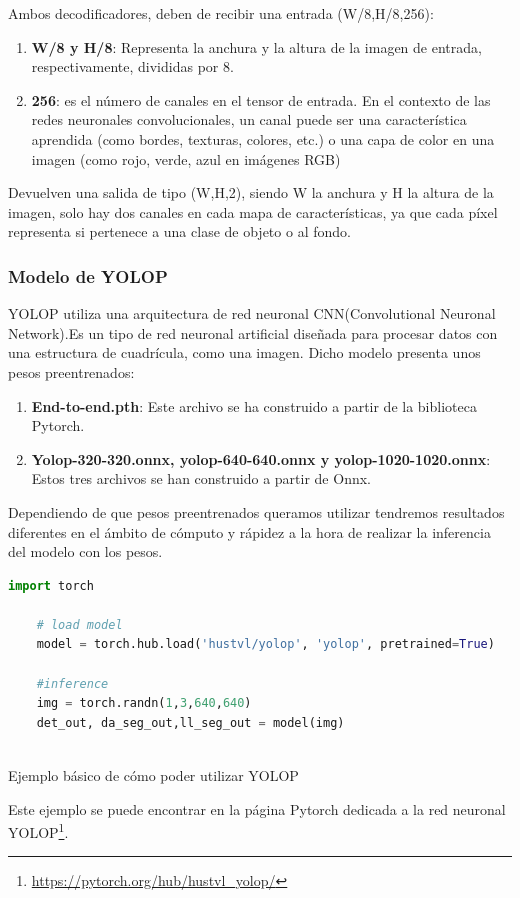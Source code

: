 Ambos decodificadores, deben de recibir una entrada (W/8,H/8,256): \newline 
\begin{enumerate}
  \item \textbf{W/8 y H/8}: Representa la anchura y la altura de la imagen de entrada, respectivamente, divididas por 8.
  \item \textbf{256}: es el número de 
  canales en el tensor de entrada. En el contexto de las redes neuronales convolucionales, 
  un canal puede ser una característica aprendida (como bordes, texturas, colores, etc.) o una capa de color en una imagen (como rojo, verde, azul en imágenes RGB)
\end{enumerate}

Devuelven una salida de tipo (W,H,2), siendo W la anchura y H la altura de la imagen, solo hay dos canales en cada mapa de características, ya que cada píxel 
representa si pertenece a una clase de objeto o al fondo. 

\subsubsection{Modelo de YOLOP}
\label{sec:Modelo_YOLOP}

YOLOP utiliza una arquitectura de red neuronal CNN(Convolutional Neuronal Network).Es un tipo de red neuronal artificial diseñada para procesar datos con una
estructura de cuadrícula, como una imagen. Dicho modelo presenta unos pesos preentrenados: 

\begin{enumerate}
  \item \textbf{End-to-end.pth}: Este archivo se ha construido a partir de la biblioteca Pytorch. 
  \item \textbf{Yolop-320-320.onnx, yolop-640-640.onnx y yolop-1020-1020.onnx}: Estos tres archivos se han construido a partir de Onnx.
\end{enumerate}

Dependiendo de que pesos preentrenados queramos utilizar tendremos resultados diferentes en el ámbito de cómputo y rápidez a la hora de 
realizar la inferencia del modelo con los pesos. \newline

\begin{code}[h]
  \begin{lstlisting}[language=Python]
    import torch

    # load model
    model = torch.hub.load('hustvl/yolop', 'yolop', pretrained=True)
    
    #inference
    img = torch.randn(1,3,640,640)
    det_out, da_seg_out,ll_seg_out = model(img)
    
  \end{lstlisting}
  \caption[Cargar modelo YOLOP con pesos preentrenados End-to-end.pth]{Ejemplo básico de cómo poder utilizar YOLOP}
  \label{cod:codejemplo}
  \end{code}  
Este ejemplo se puede encontrar en la página Pytorch dedicada a la red neuronal YOLOP\footnote{\url{https://pytorch.org/hub/hustvl_yolop/}}.

